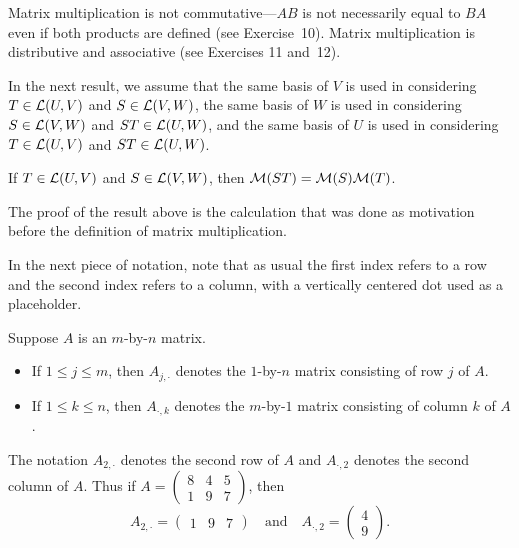 Matrix multiplication is not commutative---$AB$ is not necessarily equal to
$BA$ even if both products are defined (see Exercise~10). Matrix multiplication
is distributive and associative (see Exercises 11 and~12).

In the next result, we assume that the same basis of $V$ is used in considering
$T\in\mathcal{L}(U,V)$ and $S\in\mathcal{L}(V,W)$, the same basis of $W$ is used in
considering $S\in\mathcal{L}(V,W)$ and $ST\in\mathcal{L}(U,W)$, and the same basis of $U$ is
used in considering $T\in\mathcal{L}(U,V)$ and $ST\in\mathcal{L}(U,W)$.

\begin{result}\label{ax:3.43}
If $T\in\mathcal{L}(U,V)$ and $S\in\mathcal{L}(V,W)$, then $\mathcal{M}(ST)=\mathcal{M}(S)\mathcal{M}(T)$.
\end{result}

The proof of the result above is the calculation that was done as motivation
before the definition of matrix multiplication.

In the next piece of notation, note that as usual the first index refers to a
row and the second index refers to a column, with a vertically centered dot
used as a placeholder.

\begin{notation}\label{ax:3.44}
Suppose $A$ is an $m$-by-$n$ matrix.
\begin{itemize}
\item If $1\le j\le m$, then $A_{j,\cdot}$ denotes the $1$-by-$n$ matrix
  consisting of row $j$ of $A$.
\item If $1\le k\le n$, then $A_{\cdot,k}$ denotes the $m$-by-$1$ matrix
  consisting of column $k$ of $A$.
\end{itemize}
\end{notation}

\begin{example}\label{ax:3.45}
The notation $A_{2,\cdot}$ denotes the second row of $A$ and $A_{\cdot,2}$
denotes the second column of $A$. Thus if
$A=\begin{pmatrix} 8 & 4 & 5\\ 1 & 9 & 7 \end{pmatrix}$, then
\[ A_{2,\cdot} = \begin{pmatrix} 1 & 9 & 7 \end{pmatrix}
   \quad\text{and}\quad
   A_{\cdot,2} = \begin{pmatrix} 4\\ 9 \end{pmatrix}. \]
\end{example}

